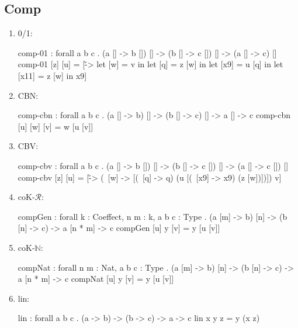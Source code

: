 \subsection{Comp}
\begin{enumerate}
\item 0/1: 
\begin{granule}
comp-01 : forall a b c  
        . (a [] -> b []) [] 
        -> (b [] -> c []) [] 
        -> (a [] -> c) []
comp-01 [z] [u] = 
    [\v -> 
        let [w] = v in 
        let [q] = z [w] in 
        let [x9] = u [q] in 
        let [x11] = z [w] in x9]
\end{granule}
\item CBN: 
\begin{granule}
comp-cbn : forall a b c  
         . (a [] -> b) [] 
         -> (b [] -> c) [] -> a [] -> c
comp-cbn [u] [w] [v] = w [u [v]]
\end{granule}
\item CBV: 
\begin{granule}
comp-cbv : forall a b c  . 
         (a [] -> b []) [] 
         -> (b [] -> c []) [] 
         -> (a [] -> c []) []
comp-cbv [z] [u] = 
    [\v -> 
        (\ [w] -> 
            [(\ [q] -> q) (u [(\ [x9] -> x9) (z [w])])]) v]
\end{granule}
\item coK-$\mathcal{R}$:
\begin{granule}
compGen : forall {k : Coeffect, n m : k, a b c : Type} 
        . (a [m] -> b) [n] 
        -> (b [n] -> c) 
        -> a [n * m] 
        -> c
compGen [u] y [v] = y [u [v]]
\end{granule}
\item coK-$\mathbb{N}$:
\begin{granule}
compNat : forall {n m : Nat, a b c : Type} 
     . (a [m] -> b) [n] 
     -> (b [n] -> c) 
     -> a [n * m] 
     -> c
compNat [u] y [v] = y [u [v]]
\end{granule}
\item lin:
\begin{granule}
lin : forall a b c  
     . (a -> b) 
     -> (b -> c) 
     -> a 
     -> c
lin x y z = y (x z)
\end{granule}
\end{enumerate}



